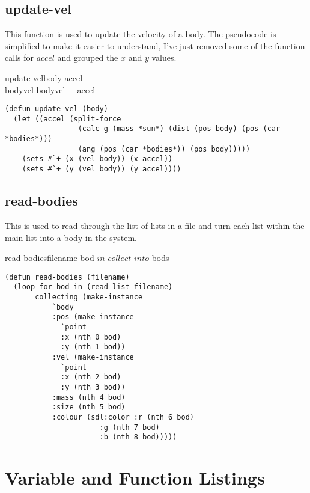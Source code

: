 \subsection{update-vel}
This function is used to update the velocity of a body. The pseudocode is
simplified to make it easier to understand, I've just removed some of the
function calls for $accel$ and grouped the $x$ and $y$ values. 

\begin{pseudocode}{update-vel}{body}
	\BEGIN
	accel \GETS {} \\
	bodyvel \GETS bodyvel + accel
	\END
\end{pseudocode}

\begin{lstlisting}
(defun update-vel (body)
  (let ((accel (split-force 
                 (calc-g (mass *sun*) (dist (pos body) (pos (car *bodies*)))
                 (ang (pos (car *bodies*)) (pos body)))))
    (sets #`+ (x (vel body)) (x accel))
    (sets #`+ (y (vel body)) (y accel))))
\end{lstlisting}

\subsection{read-bodies}
This is used to read through the list of lists in a file and turn each list
within the main list into a body in the system. \\
\begin{pseudocode}{read-bodies}{filename}
	\FOREACH bod $ in $ 
	\DO $collect $  $ into $ bods\\
\end{pseudocode}

\begin{lstlisting}
(defun read-bodies (filename)
  (loop for bod in (read-list filename)
       collecting (make-instance 
		   `body
		   :pos (make-instance
			 `point
			 :x (nth 0 bod)
			 :y (nth 1 bod))
		   :vel (make-instance
			 `point
			 :x (nth 2 bod)	
			 :y (nth 3 bod))
		   :mass (nth 4 bod)
		   :size (nth 5 bod)
		   :colour (sdl:color :r (nth 6 bod)
				      :g (nth 7 bod)
				      :b (nth 8 bod)))))
\end{lstlisting}

\section{Variable and Function Listings}
